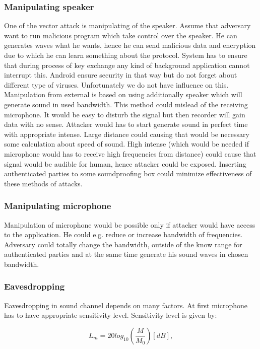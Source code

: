 \documentclass[11pt,titlepage]{article}
\theoremstyle{plain}
\begin{document}
\subsubsection{Manipulating speaker}
One of the vector attack is manipulating of the speaker. Assume that adversary want to run malicious program which take control over the speaker. He can generates waves what he wants, hence he can send malicious data and encryption due to which he can learn something about the protocol. System has to ensure that during process of key exchange any kind of background application cannot interrupt this. Android ensure security in that way but do not forget about different type of viruses. Unfortunately we do not have influence on this. Manipulation from external is based on using additionally speaker which will generate sound in used bandwidth. This method could mislead of the receiving microphone. It would be easy to disturb the signal but then recorder will gain data with no sense. Attacker would has to start generate sound in perfect time with appropriate intense. Large distance could causing that would be necessary some calculation about speed of sound. High intense (which would be needed if microphone would has to receive high frequencies from distance) could cause that signal would be audible for human, hence attacker could be exposed. Inserting authenticated parties to some soundproofing box could minimize effectiveness of these methods of attacks.

\subsubsection{Manipulating microphone}
Manipulation of microphone would be possible only if attacker would have access to the application. He could e.g. reduce or increase bandwidth of frequencies. Adversary could totally change the bandwidth, outside of the know range for authenticated parties and at the same time generate his sound waves in chosen bandwidth.

\subsubsection{Eavesdropping}
Eavesdropping in sound channel depends on many factors.
 At first microphone has to have appropriate sensitivity level. Sensitivity level is given by:
 
 \begin{equation}
 L_m = 20 log_{10}\left(\frac{M}{M_0}\right)[dB],
 \end{equation}
 
\end{document}
